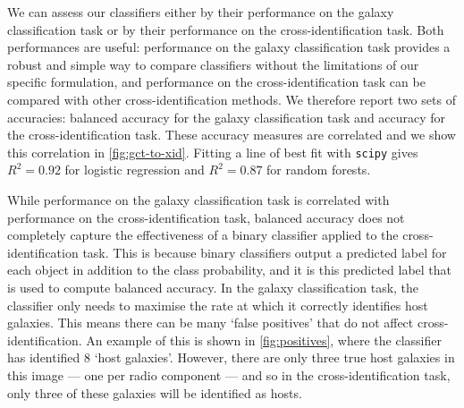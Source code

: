 \documentclass[fleqn,usenatbib,usedcolumn]{mnras}
\begin{document}
    We can assess our classifiers either by their performance on the galaxy classification task or by their performance on the cross-identification task. Both performances are useful: performance on the galaxy classification task provides a robust and simple way to compare classifiers without the limitations of our specific formulation, and performance on the cross-identification task can be compared with other cross-identification methods. We therefore report two sets of accuracies: balanced accuracy for the galaxy classification task and accuracy for the cross-identification task. These accuracy measures are correlated and we show this correlation in \autoref{fig:gct-to-xid}. Fitting a line of best fit with \texttt{scipy} gives $R^2 = 0.92$ for logistic regression and $R^2 = 0.87$ for random forests.

    While performance on the galaxy classification task is correlated with performance on the cross-identification task, balanced accuracy does not completely capture the effectiveness of a binary classifier applied to the cross-identification task. This is because binary classifiers output a predicted label for each object in addition to the class probability, and it is this predicted label that is used to compute balanced accuracy. In the galaxy classification task, the classifier only needs to maximise the rate at which it correctly identifies host galaxies. This means there can be many `false positives' that do not affect cross-identification. An example of this is shown in \autoref{fig:positives}, where the classifier has identified 8 `host galaxies'. However, there are only three true host galaxies in this image --- one per radio component --- and so in the cross-identification task, only three of these galaxies will be identified as hosts.
\end{document}
